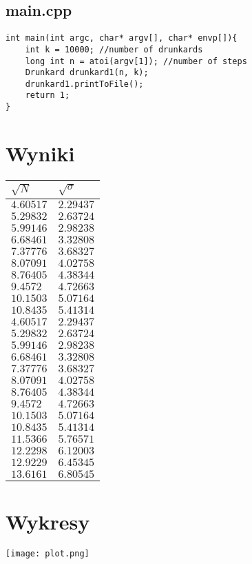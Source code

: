\documentclass{article}
\begin{document}
\subsection{main.cpp}
\begin{lstlisting}
int main(int argc, char* argv[], char* envp[]){
	int k = 10000; //number of drunkards
	long int n = atoi(argv[1]); //number of steps
	Drunkard drunkard1(n, k);
	drunkard1.printToFile();
	return 1;
}
\end{lstlisting}

\section{Wyniki}
\begin{center}
\begin{tabular}{l|l}
$\sqrt{N}$ & $\sqrt{\sigma}$\\ \hline
$4.60517$ & $2.29437$\\
$5.29832$ & $2.63724$\\
$5.99146$ & $2.98238$\\
$6.68461$ & $3.32808$\\
$7.37776$ & $3.68327$\\
$8.07091$ & $4.02758$\\
$8.76405$ & $4.38344$\\
$9.4572$ & $4.72663$\\
$10.1503$ & $5.07164$\\
$10.8435$ & $5.41314$\\
$4.60517$ & $2.29437$\\
$5.29832$ & $2.63724$\\
$5.99146$ & $2.98238$\\
$6.68461$ & $3.32808$\\
$7.37776$ & $3.68327$\\
$8.07091$ & $4.02758$\\
$8.76405$ & $4.38344$\\
$9.4572$ & $4.72663$\\
$10.1503$ & $5.07164$\\
$10.8435$ & $5.41314$\\
$11.5366$ & $5.76571$\\
$12.2298$ & $6.12003$\\
$12.9229$ & $6.45345$\\
$13.6161$ & $6.80545$\\
\end{tabular}
\end{center}

\section{Wykresy}
\texttt{[image: plot.png]}
\end{document}

